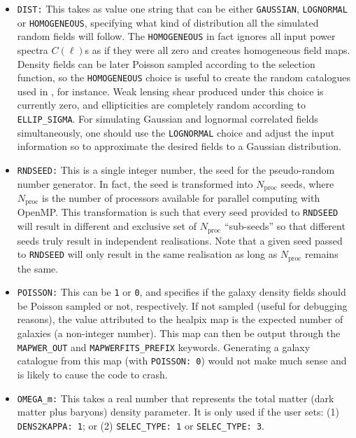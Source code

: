 \documentclass[12pt]{book} %
\newcommand{\nv}[1]{\mathrm{#1}}                 %
\begin{document}
\begin{itemize}

\item {\tt DIST:} This takes as value one string that can be either {\tt GAUSSIAN}, 
  {\tt LOGNORMAL} or {\tt HOMOGENEOUS}, specifying what kind of distribution all 
  the simulated random fields will follow. The {\tt HOMOGENEOUS} in fact ignores 
  all input power spectra $C(\ell)$s as if they were all zero and creates homogeneous 
  field maps. Density fields can be later Poisson sampled according to the selection 
  function, so the {\tt HOMOGENEOUS} choice is useful to create the random catalogues 
  used in \citet{LandySzalay93x}, for instance. Weak lensing shear produced under this 
  choice is currently zero, and ellipticities are completely random according to 
  {\tt ELLIP\_SIGMA}. For simulating Gaussian and lognormal correlated fields 
  simultaneously, one should use the {\tt LOGNORMAL} choice and adjust the input 
  information so to approximate the desired fields to a Gaussian distribution.

\item {\tt RNDSEED:} This is a single integer number, the seed for the pseudo-random 
  number generator. In fact, the seed is transformed into $N_{\nv{proc}}$ seeds, where 
  $N_{\nv{proc}}$ is the number of processors available for parallel computing with 
  {\sc OpenMP}. This transformation is such that every seed provided to {\tt RNDSEED} 
  will result in different and exclusive set of $N_{\nv{proc}}$ ``sub-seeds'' so that different seeds truly 
  result in independent realisations. Note that a given seed passed to {\tt RNDSEED} will 
  only result in the same realisation as long as $N_{\nv{proc}}$ remains the same.

\item {\tt POISSON:} This can be {\tt 1} or {\tt 0}, and specifies if the galaxy density 
  fields should be Poisson sampled or not, respectively. If not sampled (useful for debugging 
  reasons), the value attributed to the {\sc healpix} map is the expected number of galaxies 
  (a non-integer number). This map can then be output through the {\tt MAPWER\_OUT} and 
  {\tt MAPWERFITS\_PREFIX} keywords. Generating a galaxy catalogue from this map (with 
  {\tt POISSON: 0}) would not make much sense and is likely to cause the code to crash.

\item {\tt OMEGA\_m:} This takes a real number that represents the total matter (dark matter 
  plus baryons) density parameter. It is only used if the user sets: (1) {\tt DENS2KAPPA: 1}; or 
  (2) {\tt SELEC\_TYPE: 1} or {\tt SELEC\_TYPE: 3}.


\end{itemize}
\end{document}
